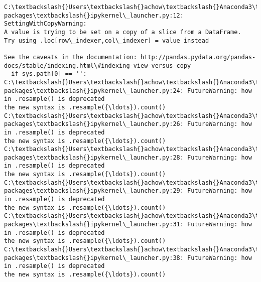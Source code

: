 \documentclass[11pt]{article}
\begin{document}
    \begin{Verbatim}[commandchars=\\\{\}]
C:\textbackslash{}Users\textbackslash{}achow\textbackslash{}Anaconda3\textbackslash{}lib\textbackslash{}site-packages\textbackslash{}ipykernel\_launcher.py:12: SettingWithCopyWarning: 
A value is trying to be set on a copy of a slice from a DataFrame.
Try using .loc[row\_indexer,col\_indexer] = value instead

See the caveats in the documentation: http://pandas.pydata.org/pandas-docs/stable/indexing.html\#indexing-view-versus-copy
  if sys.path[0] == '':
C:\textbackslash{}Users\textbackslash{}achow\textbackslash{}Anaconda3\textbackslash{}lib\textbackslash{}site-packages\textbackslash{}ipykernel\_launcher.py:24: FutureWarning: how in .resample() is deprecated
the new syntax is .resample({\ldots}).count()
C:\textbackslash{}Users\textbackslash{}achow\textbackslash{}Anaconda3\textbackslash{}lib\textbackslash{}site-packages\textbackslash{}ipykernel\_launcher.py:26: FutureWarning: how in .resample() is deprecated
the new syntax is .resample({\ldots}).count()
C:\textbackslash{}Users\textbackslash{}achow\textbackslash{}Anaconda3\textbackslash{}lib\textbackslash{}site-packages\textbackslash{}ipykernel\_launcher.py:28: FutureWarning: how in .resample() is deprecated
the new syntax is .resample({\ldots}).count()
C:\textbackslash{}Users\textbackslash{}achow\textbackslash{}Anaconda3\textbackslash{}lib\textbackslash{}site-packages\textbackslash{}ipykernel\_launcher.py:29: FutureWarning: how in .resample() is deprecated
the new syntax is .resample({\ldots}).count()
C:\textbackslash{}Users\textbackslash{}achow\textbackslash{}Anaconda3\textbackslash{}lib\textbackslash{}site-packages\textbackslash{}ipykernel\_launcher.py:31: FutureWarning: how in .resample() is deprecated
the new syntax is .resample({\ldots}).count()
C:\textbackslash{}Users\textbackslash{}achow\textbackslash{}Anaconda3\textbackslash{}lib\textbackslash{}site-packages\textbackslash{}ipykernel\_launcher.py:38: FutureWarning: how in .resample() is deprecated
the new syntax is .resample({\ldots}).count()

    \end{Verbatim}
\end{document}
